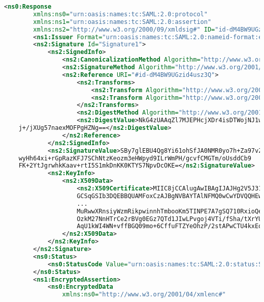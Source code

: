 \begin{enumerate}
    \begin{lstlisting}[language=xml, caption={Exemplo de um resposta SAML com uma asserção cifrada e assinada enviado pelo IDP}, label={lst:assertion}]
        <ns0:Response
        xmlns:ns0="urn:oasis:names:tc:SAML:2.0:protocol"
        xmlns:ns1="urn:oasis:names:tc:SAML:2.0:assertion"
        xmlns:ns2="http://www.w3.org/2000/09/xmldsig#" ID="id-dM4BW9UGzid4usz3Q" InResponseTo="id-v4QBeX2YaJqSzuk4L" Version="2.0" IssueInstant="2021-06-06T04:38:21Z" Destination="http://localhost:8081/identity">
        <ns1:Issuer Format="urn:oasis:names:tc:SAML:2.0:nameid-format:entity">http://localhost:8082/idp.xml</ns1:Issuer>
        <ns2:Signature Id="Signature1">
            <ns2:SignedInfo>
                <ns2:CanonicalizationMethod Algorithm="http://www.w3.org/2001/10/xml-exc-c14n#"/>
                <ns2:SignatureMethod Algorithm="http://www.w3.org/2001/04/xmldsig-more#rsa-sha512"/>
                <ns2:Reference URI="#id-dM4BW9UGzid4usz3Q">
                    <ns2:Transforms>
                        <ns2:Transform Algorithm="http://www.w3.org/2000/09/xmldsig#enveloped-signature"/>
                        <ns2:Transform Algorithm="http://www.w3.org/2001/10/xml-exc-c14n#"/>
                    </ns2:Transforms>
                    <ns2:DigestMethod Algorithm="http://www.w3.org/2001/04/xmlenc#sha512"/>
                    <ns2:DigestValue>NkG4zUAAqZl7MJEPHcjXDr4isDTWojNJ1w/rLfGD35QI6nsvRw0zpM3PHiQAeBnf
    j+/jXUg57naexMOFPgHZNg==</ns2:DigestValue>
                </ns2:Reference>
            </ns2:SignedInfo>
            <ns2:SignatureValue>SBy7glEBU4Qg8Yi61ohSfJA0NMR0yo7h+Za97vZc6xKE3rDH8yjY/I/UJ/b3jmBz
    wyHh64xi+rGpRazKFJ7SChNtzKeozm3eHWpyd9ILrWmPH/gcvfCMGTm/oUsddCb9
    FK+2YtJgrwhkKaav+rtI5S1mkDnKK0KTYS7NpvDcOKE=</ns2:SignatureValue>
            <ns2:KeyInfo>
                <ns2:X509Data>
                    <ns2:X509Certificate>MIIC8jCCAlugAwIBAgIJAJHg2V5J31I8MA0
                    GCSqGSIb3DQEBBQUAMFoxCzAJBgNVBAYTAlNFMQ0wCwYDVQQHEwRVbW
                    ...
                    MuRwwXRnsiyWzmRikpwinnhTmbooKm5TINPE7A7gSQ710RxioQePPhZ
                    OzkM27NnHTrCe2rBVg0EGz7QTd1JIwLPvgoj4VTi/fSha/tXrYUaqc9
                    AqU1kWI4WN+vffBGQ09mo+6CffuFTZYeOhzP/2stAPwCTU4kxEoiy0KpZMANI=</ns2:X509Certificate>
                </ns2:X509Data>
            </ns2:KeyInfo>
        </ns2:Signature>
        <ns0:Status>
            <ns0:StatusCode Value="urn:oasis:names:tc:SAML:2.0:status:Success"/>
        </ns0:Status>
        <ns1:EncryptedAssertion>
            <ns0:EncryptedData
                xmlns:ns0="http://www.w3.org/2001/04/xmlenc#"

\end{lstlisting}
\end{enumerate}
